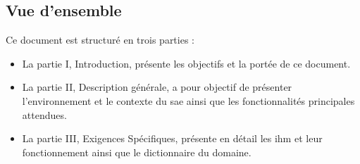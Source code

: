 \newpage
\subsection{Vue d'ensemble} %

Ce document est structuré en trois parties :
\begin{itemize}
    \item La partie I, Introduction, présente les objectifs et la portée de ce document.
    \item La partie II, Description générale, a pour objectif de présenter l'environnement et le contexte du \gls{sae} ainsi que les fonctionnalités principales attendues.
    \item La partie III, Exigences Spécifiques, présente en détail les \gls{ihm} et leur fonctionnement ainsi que le dictionnaire du domaine.
\end{itemize}